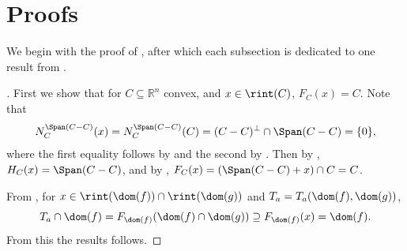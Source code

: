 \documentclass{article}
\theoremstyle{plain}
\theoremstyle{definition}
\theoremstyle{remark}
\begin{document}
\section{Proofs}
\label{loc:body.proofs}
We begin with the proof of , after which each subsection is dedicated to
one result from .
\begin{proof}[\hypertarget{loc:recovery_of_the_classical_results.proof}Proof of \Cref{loc:recovery_of_the_classical_results.statement}]

First we show that for $C \subseteq \mathbb{R}^n$ convex, and $x \in \rint(C)$, $F_C(x)= C$. 
Note that
\begin{equation*}
N_C^{\Span(C-C)}(x) = N_C^{\Span(C-C)}(C) = (C-C)^\perp \cap \Span(C-C)= \{0\},
\end{equation*}
where the first equality follows by  and the second by .
Then by , $H_C(x) = \Span(C-C)$, and by , $F_C(x) = (\Span(C-C) + x) \cap C = C$.

From , for $x \in \rint(\dom(f)) \cap \rint(\dom(g))$ and $T_a = T_a(\dom(f), \dom(g))$,
\begin{equation*}
T_a \cap \dom(f) = F_{\dom(f)} (\dom(f) \cap \dom(g)) \supseteq F_{\dom(f)}(x) = \dom(f).
\end{equation*}
From this the results follows.
\end{proof}
\end{document}
